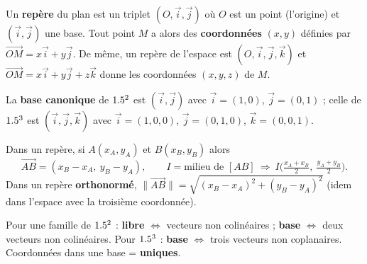 \begin{definition}[Repère]
Un \textbf{repère} du plan est un triplet $(O,\vec i,\vec j)$ où $O$ est un point (l'origine) et
$(\vec i,\vec j)$ une base. Tout point $M$ a alors des \textbf{coordonnées} $(x,y)$ définies par
$\vec{OM}=x\vec i+y\vec j$. De même, un repère de l'espace est $(O,\vec i,\vec j,\vec k)$ et
$\vec{OM}=x\vec i+y\vec j+z\vec k$ donne les coordonnées $(x,y,z)$ de $M$.
\end{definition}

\begin{exemple}
La \textbf{base canonique} de $1.5^2$ est $(\vec i,\vec j)$ avec $\vec i=(1,0)$, $\vec j=(0,1)$ ;
celle de $1.5^3$ est $(\vec i,\vec j,\vec k)$ avec $\vec i=(1,0,0)$, $\vec j=(0,1,0)$, $\vec k=(0,0,1)$.
\end{exemple}

\begin{propriete}
Dans un repère, si $A(x_A,y_A)$ et $B(x_B,y_B)$ alors
\[
\vec{AB}=(x_B-x_A,\ y_B-y_A),\qquad
I=\text{milieu de }[AB]\ \Rightarrow\ I\Big(\tfrac{x_A+x_B}{2},\ \tfrac{y_A+y_B}{2}\Big).
\]
Dans un repère \textbf{orthonormé}, $\|\vec{AB}\|=\sqrt{(x_B-x_A)^2+(y_B-y_A)^2}$
(idem dans l'espace avec la troisième coordonnée).
\end{propriete}

\begin{illus}
\end{illus}

\begin{aretenir}
Pour une famille de $1.5^2$ : \textbf{libre} $\Leftrightarrow$ vecteurs non colinéaires ;
\textbf{base} $\Leftrightarrow$ deux vecteurs non colinéaires. Pour $1.5^3$ : \textbf{base}
$\Leftrightarrow$ trois vecteurs non coplanaires. Coordonnées dans une base = \textbf{uniques}.
\end{aretenir}

